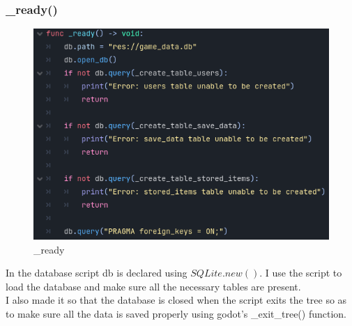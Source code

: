 \documentclass{article}
\begin{document}
        \subsubsection{\_ready()}
        \begin{figure}[H]
                \centering
                \includegraphics{images/development/database_ready.PNG}
                \caption{\_ready}
        \end{figure}
        In the database script db is declared using $SQLite.new()$. I use the script to load the database and make sure all the necessary tables are present.\\
        I also made it so that the database is closed when the script exits the tree so as to make sure all the data is saved properly using godot's \_exit\_tree() function.\\
\end{document}
